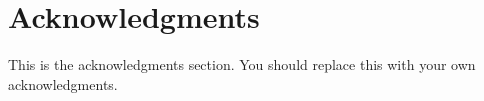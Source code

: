 \section*{Acknowledgments}

This is the acknowledgments section.  You should replace this with your
own acknowledgments.